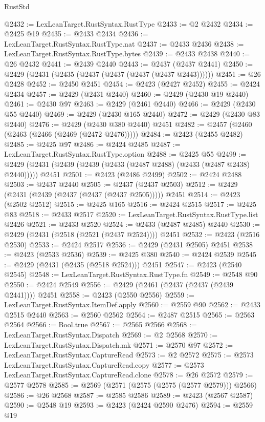 \begin{lexlean}{RustStd}
\begin{coremodule}
@2432 := LexLeanTarget.RustSyntax.RustType
@2433 := @2 @2432
@2434 := @2425 @19
@2435 := @2433 @2434
@2436 := LexLeanTarget.RustSyntax.RustType.nat
@2437 := @2433 @2436
@2438 := LexLeanTarget.RustSyntax.RustType.bytes
@2439 := @2433 @2438
@2440 := @26 @2432
@2441 := @2439 @2440
@2443 := @2437 (@2437 @2441)
@2450 := @2429 (@2431 (@2435 (@2437 (@2437 (@2437 (@2437 @2443))))))
@2451 := @26 @2428
@2452 := @2450 @2451
@2454 := @2423 (@2427 @2452)
@2455 := @2424 @2434
@2457 := @2429 (@2431 @2440)
@2460 := @2429 (@2430 @19 @2440)
@2461 := @2430 @97
@2463 := @2429 (@2461 @2440)
@2466 := @2429 (@2430 @55 @2440)
@2469 := @2429 (@2430 @165 @2440)
@2472 := @2429 (@2430 @83 @2440)
@2476 := @2429 (@2430 @380 @2440) @2451
@2482 := @2457 (@2460 (@2463 (@2466 (@2469 (@2472 @2476)))))
@2484 := @2423 (@2455 @2482)
@2485 := @2425 @97
@2486 := @2424 @2485
@2487 := LexLeanTarget.RustSyntax.RustType.option
@2488 := @2425 @55
@2499 := @2429 (@2431 (@2439 (@2439 (@2433 (@2487 @2488) (@2433 (@2487 @2438) @2440))))) @2451
@2501 := @2423 (@2486 @2499)
@2502 := @2424 @2488
@2503 := @2437 @2440
@2505 := @2437 (@2437 @2503)
@2512 := @2429 (@2431 (@2439 (@2437 (@2437 (@2437 @2505))))) @2451
@2514 := @2423 (@2502 @2512)
@2515 := @2425 @165
@2516 := @2424 @2515
@2517 := @2425 @83
@2518 := @2433 @2517
@2520 := LexLeanTarget.RustSyntax.RustType.list @2426
@2521 := @2433 @2520
@2524 := @2433 (@2487 @2485) @2440
@2530 := @2429 (@2431 (@2518 (@2521 (@2437 @2524)))) @2451
@2532 := @2423 (@2516 @2530)
@2533 := @2424 @2517
@2536 := @2429 (@2431 @2505) @2451
@2538 := @2423 (@2533 @2536)
@2539 := @2425 @380
@2540 := @2424 @2539
@2545 := @2429 (@2431 (@2435 (@2518 @2524))) @2451
@2547 := @2423 (@2540 @2545)
@2548 := LexLeanTarget.RustSyntax.RustType.fn
@2549 := @2548 @90
@2550 := @2424 @2549
@2556 := @2429 (@2461 (@2437 (@2437 (@2439 @2441)))) @2451
@2558 := @2423 (@2550 @2556)
@2559 := LexLeanTarget.RustSyntax.ItemDef.apply
@2560 := @2559 @90
@2562 := @2433 @2515 @2440
@2563 := @2560 @2562
@2564 := @2487 @2515
@2565 := @2563 @2564
@2566 := Bool.true
@2567 := @2565 @2566
@2568 := LexLeanTarget.RustSyntax.Dispatch
@2569 := @2 @2568
@2570 := LexLeanTarget.RustSyntax.Dispatch.mk
@2571 := @2570 @97
@2572 := LexLeanTarget.RustSyntax.CaptureRead
@2573 := @2 @2572
@2575 := @2573 LexLeanTarget.RustSyntax.CaptureRead.copy
@2577 := @2573 LexLeanTarget.RustSyntax.CaptureRead.clone
@2578 := @26 @2572
@2579 := @2577 @2578
@2585 := @2569 (@2571 (@2575 (@2575 (@2577 @2579))) @2566)
@2586 := @26 @2568
@2587 := @2585 @2586
@2589 := @2423 (@2567 @2587)
@2590 := @2548 @19
@2593 := @2423 (@2424 @2590 @2476)
@2594 := @2559 @19

\end{coremodule}
\end{lexlean}
